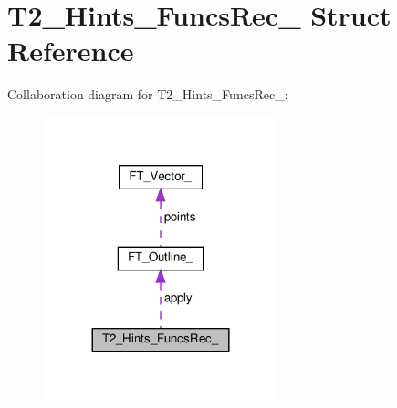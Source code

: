 \hypertarget{structT2__Hints__FuncsRec__}{}\section{T2\+\_\+\+Hints\+\_\+\+Funcs\+Rec\+\_\+ Struct Reference}
\label{structT2__Hints__FuncsRec__}


Collaboration diagram for T2\+\_\+\+Hints\+\_\+\+Funcs\+Rec\+\_\+\+:
\nopagebreak
\begin{figure}[H]
\begin{center}
\leavevmode
\includegraphics[width=192pt]{structT2__Hints__FuncsRec____coll__graph}
\end{center}
\end{figure}
